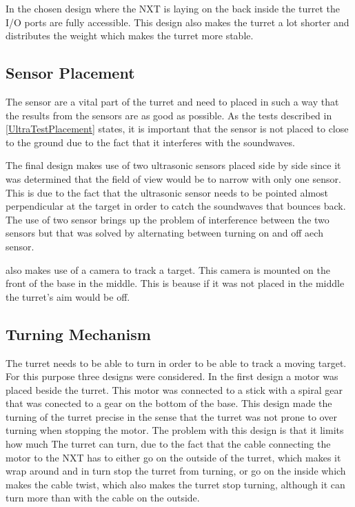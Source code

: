 In the chosen design where the NXT is laying on the back inside the turret the
I/O ports are fully accessible. This design also makes the turret a lot shorter
and distributes the weight which makes the turret more stable. 
\subsection{Sensor Placement}
The sensor are a vital part of the turret and need to placed in such a way that
the results from the sensors are as good as possible. As the tests described in
\autoref{UltraTestPlacement} states, it is important that the sensor is not
placed to close to the ground due to the fact that it interferes with the
soundwaves.\nl

The final design makes use of two ultrasonic sensors placed side by side since
it was determined that the field of view would be to narrow with only one
sensor. This is due to the fact that the ultrasonic sensor needs to be pointed
almost perpendicular at the target in order to catch the soundwaves that bounces
back. The use of two sensor brings up the problem of interference between the
two sensors but that was solved by alternating between turning on and off aech
sensor.\nl

\name also makes use of a camera to track a target. This camera is mounted on
the front of the base in the middle. This is beause if it was not placed in the
middle the turret's aim would be off.

\subsection{Turning Mechanism}
The turret needs to be able to turn in order to be able to track a moving
target. For this purpose three designs were considered. In the first design a
motor was placed beside the turret. This motor was connected to a stick with a
spiral gear that was conected to a gear on the bottom of the base. This design
made the turning of the turret precise in the sense that the turret was not
prone to over turning when stopping the motor. The problem with this design is
that it limits how much The turret can turn, due to the fact that the cable
connecting the motor to the NXT has to either go on the outside of the turret,
which makes it wrap around and in turn stop the turret from turning, or go on
the inside which makes the cable twist, which also makes the turret stop
turning, although it can turn more than with the cable on the outside.\nl

